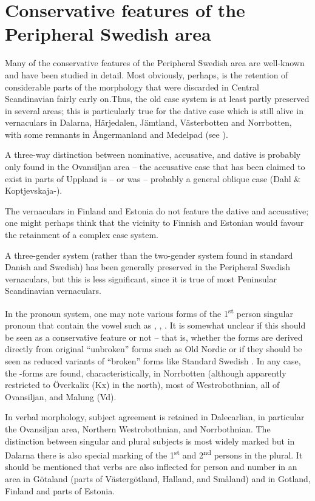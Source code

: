 \section{Conservative features of the Peripheral Swedish area}

Many of the conservative features of the Peripheral Swedish area are well-known and have been studied in detail. Most obviously, perhaps, is the retention of considerable parts of the morphology that were discarded in Central Scandinavian fairly early on.Thus, the old case system is at least partly preserved in several areas; this is particularly true for the dative case which is still alive in vernaculars in Dalarna, Härjedalen, Jämtland, Västerbotten and Norrbotten, with some remnants in Ångermanland and Medelpad (see ). 

A three-way distinction between nominative, accusative, and dative is probably only found in the Ovansiljan area – the accusative case that has been claimed to exist in parts of Uppland is – or was – probably a general oblique case (Dahl \& Koptjevskaja-\citet{Tamm2006}). 

The vernaculars in Finland and Estonia do not feature the dative and accusative; one might perhaps think that the vicinity to Finnish and Estonian would favour the retainment of a complex case system. 

A three-gender system (rather than the two-gender system found in standard Danish and Swedish) has been generally preserved in the Peripheral Swedish vernaculars, but this is less significant, since it is true of most Peninsular Scandinavian vernaculars. 

In the pronoun system, one may note various forms of the 1\textsuperscript{st} person singular pronoun that contain the vowel such as , , . It is somewhat unclear if this should be seen as a conservative feature or not – that is, whether the forms are derived directly from original “unbroken” forms such as Old Nordic or if they should be seen as reduced variants of “broken” forms like Standard Swedish . In any case, the -forms are found, characteristically, in Norrbotten (although apparently restricted to Överkalix (Kx) in the north), most of Westrobothnian, all of Ovansiljan, and Malung (Vd). 

In verbal morphology, subject agreement is retained in Dalecarlian, in particular the Ovansiljan area, Northern Westrobothnian, and Norrbothnian. The distinction between singular and plural subjects is most widely marked but in Dalarna there is also special marking of the 1\textsuperscript{st} and 2\textsuperscript{nd} persons in the plural. It should be mentioned that verbs are also inflected for person and number in an area in Götaland (parts of Västergötland, Halland, and Småland) and in Gotland, Finland and parts of Estonia.

